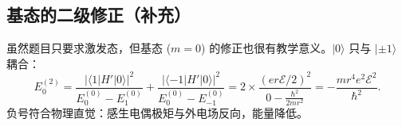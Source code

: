 \subsection{基态的二级修正（补充）}

\begin{derivationbox}[基态的二级修正]
虽然题目只要求激发态，但基态 ($m=0$) 的修正也很有教学意义。$|0\rangle$ 只与 $|{\pm}1\rangle$ 耦合：
\[
E_0^{(2)} = \frac{|\langle 1|H'|0\rangle|^2}{E_0^{(0)}-E_1^{(0)}} + \frac{|\langle -1|H'|0\rangle|^2}{E_0^{(0)}-E_{-1}^{(0)}}
= 2\times\frac{(er\mathscr{E}/2)^2}{0-\frac{\hbar^2}{2mr^2}}
= -\frac{mr^4e^2\mathscr{E}^2}{\hbar^2}.
\]
负号符合物理直觉：感生电偶极矩与外电场反向，能量降低。
\end{derivationbox}
